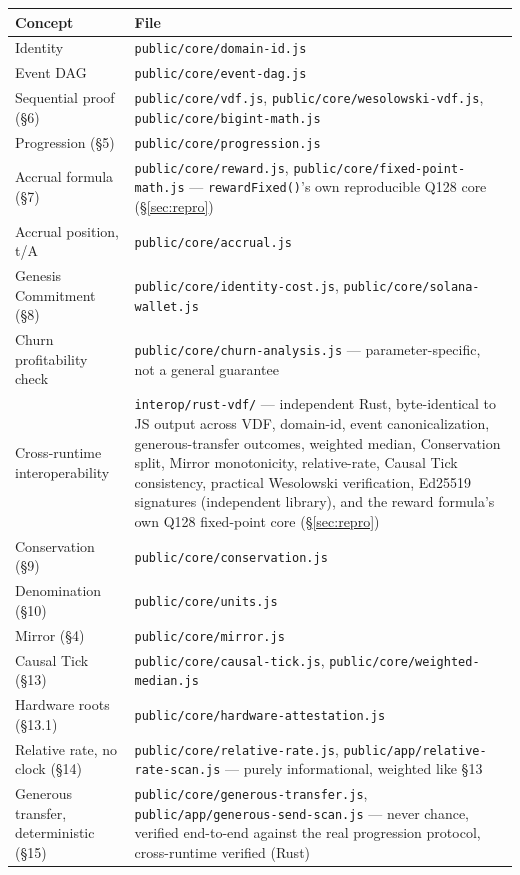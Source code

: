 \documentclass[10pt]{article}
\newcommand{\code}[1]{\texttt{\small #1}}
\begin{document}
\begin{center}
\small
\begin{tabular}{@{}p{5cm}p{9.5cm}@{}}
\toprule
\textbf{Concept} & \textbf{File} \\
\midrule
Identity & \code{public/core/domain-id.js} \\
Event DAG & \code{public/core/event-dag.js} \\
Sequential proof (\S6) & \code{public/core/vdf.js}, \code{public/core/wesolowski-vdf.js}, \code{public/core/bigint-math.js} \\
Progression (\S5) & \code{public/core/progression.js} \\
Accrual formula (\S7) & \code{public/core/reward.js}, \code{public/core/fixed-point-math.js} --- \code{rewardFixed()}'s own reproducible Q128 core (\S\ref{sec:repro}) \\
Accrual position, t/A & \code{public/core/accrual.js} \\
Genesis Commitment (\S8) & \code{public/core/identity-cost.js}, \code{public/core/solana-wallet.js} \\
Churn profitability check & \code{public/core/churn-analysis.js} --- parameter-specific, not a general guarantee \\
Cross-runtime interoperability & \code{interop/rust-vdf/} --- independent Rust, byte-identical to JS output across VDF, domain-id, event canonicalization, generous-transfer outcomes, weighted median, Conservation split, Mirror monotonicity, relative-rate, Causal Tick consistency, practical Wesolowski verification, Ed25519 signatures (independent library), and the reward formula's own Q128 fixed-point core (\S\ref{sec:repro}) \\
Conservation (\S9) & \code{public/core/conservation.js} \\
Denomination (\S10) & \code{public/core/units.js} \\
Mirror (\S4) & \code{public/core/mirror.js} \\
Causal Tick (\S13) & \code{public/core/causal-tick.js}, \code{public/core/weighted-median.js} \\
Hardware roots (\S13.1) & \code{public/core/hardware-attestation.js} \\
Relative rate, no clock (\S14) & \code{public/core/relative-rate.js}, \code{public/app/relative-rate-scan.js} --- purely informational, weighted like \S13 \\
Generous transfer, deterministic (\S15) & \code{public/core/generous-transfer.js}, \code{public/app/generous-send-scan.js} --- never chance, verified end-to-end against the real progression protocol, cross-runtime verified (Rust) \\

\end{tabular}
\end{center}
\end{document}
